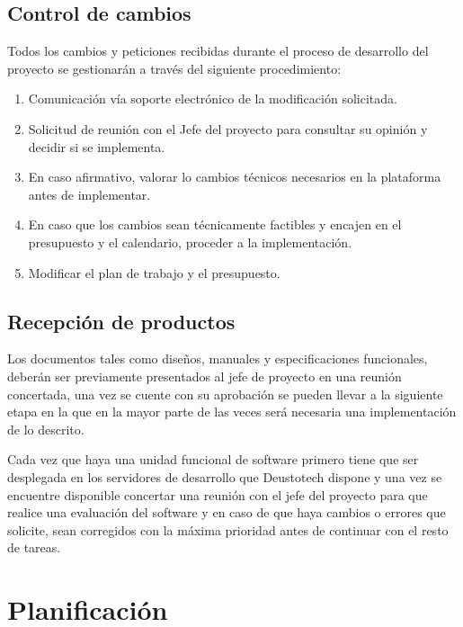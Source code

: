 \documentclass{DeustoFDP}
\begin{document}
\section{Control de cambios}
Todos los cambios y peticiones recibidas durante el proceso de desarrollo del proyecto se gestionarán a través del siguiente procedimiento:
\begin{enumerate}
	\item Comunicación vía soporte electrónico de la modificación solicitada.
	\item Solicitud de reunión con el Jefe del proyecto para consultar su opinión y decidir si se implementa.
	\item En caso afirmativo, valorar lo cambios técnicos necesarios en la plataforma antes de implementar.
	\item En caso que los cambios sean técnicamente factibles y encajen en el presupuesto y el calendario, proceder a la implementación.
	\item Modificar el plan de trabajo y el presupuesto.
\end{enumerate}

\section{Recepción de productos}
Los documentos tales como diseños, manuales y especificaciones funcionales, deberán ser previamente presentados al jefe de proyecto en una reunión concertada, una vez se cuente con su aprobación se pueden llevar a la siguiente etapa en la que en la mayor parte de las veces será necesaria una implementación de lo descrito.

Cada vez que haya una unidad funcional de software primero tiene que ser desplegada en los servidores de desarrollo que Deustotech dispone y una vez se encuentre disponible concertar una reunión con el jefe del proyecto para que realice una evaluación del software y en caso de que haya cambios o errores que solicite, sean corregidos con la máxima prioridad antes de continuar con el resto de tareas.
\newpage

\chapter{Planificación}
\end{document}
